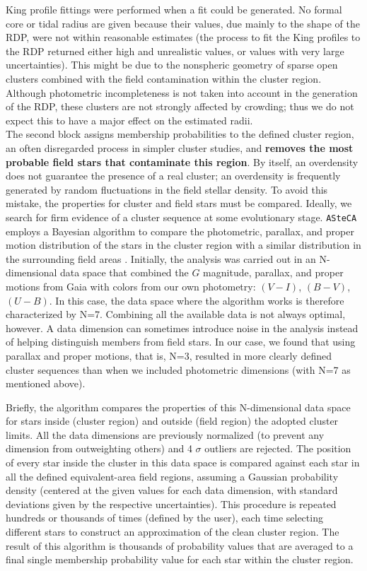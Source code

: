 \documentclass[draft]{aa}
\begin{document}
King profile \citep{King_1962} fittings were performed when
a fit could be generated. No formal core or tidal radius are given because
their values, due mainly to the shape of the RDP, were not within reasonable
estimates (the process to fit the King profiles to the RDP returned either
high and unrealistic values, or values with very large uncertainties).
This might be due to the nonspheric geometry of sparse open clusters
combined with the field contamination within the cluster region. Although
photometric incompleteness is not taken into account in the generation of the
RDP, these clusters are not strongly affected by crowding; thus we do not
expect this to have a major effect on the estimated radii.\\

The second block assigns membership probabilities to the defined
cluster region, an often disregarded process in simpler cluster studies, 
and \textbf{removes the most probable field stars that contaminate this region}.
By itself, an overdensity does not guarantee the presence of a real cluster;
 an overdensity is frequently generated by random fluctuations in the field stellar
density. To avoid this mistake, the properties for cluster and
field stars must be compared. Ideally, we search for firm evidence of
a cluster sequence at some evolutionary stage. \texttt{ASteCA} employs a
Bayesian algorithm to compare the photometric, parallax, and proper motion
distribution of the stars in the cluster region with a similar distribution in
the surrounding field areas \citep{Perren_2015}. Initially, the analysis
was carried out in an N-dimensional data space that combined the
$G$ magnitude, parallax, and proper motions from Gaia with colors from our own
photometry: $(V-I)$, $(B-V)$, $(U-B)$. In this case, the data space where
the algorithm works is therefore characterized by N=7.
Combining all the available data is not always optimal, however. A
data dimension can sometimes introduce noise in the analysis instead of helping
distinguish members from field stars. In our case, we found that using
parallax and proper motions, that is, N=3, resulted in more clearly defined
cluster sequences than when we included photometric dimensions (with N=7 as
mentioned above).

%
Briefly, the algorithm compares the properties of this N-dimensional data space
for stars inside (cluster region) and outside (field region)
the adopted cluster limits. All the data dimensions are previously normalized 
(to prevent any dimension from outweighting others) and 4 $\sigma$ outliers are
rejected.
The position of every star inside the cluster in this data space is compared
against each star in all the defined equivalent-area field regions,
assuming a Gaussian probability density (centered at the given values for each
data dimension, with standard deviations given by the respective
uncertainties). This procedure is repeated hundreds or thousands of times 
(defined by the user), each time selecting different stars to construct an
approximation of the clean cluster region. The result of this
algorithm is thousands of probability values that are averaged to a final
single membership probability value for each star within the cluster region.
\end{document}
